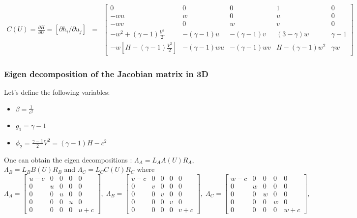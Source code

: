 \documentclass{article}
\begin{document}
\begin{eqnarray}
  C(U) = \frac{\partial H}{\partial U} = \left[ \partial h_i/\partial u_j \right] & = & \left[
    \begin{array}{ccccc}
      0 & 0 & 0 & 1 & 0\\
      -w u & w & 0 & u & 0\\
      -w v & 0 & w & v & 0\\
      -w^2+(\gamma-1)\frac{V^2}{2} & -(\gamma-1)u & -(\gamma-1)v & (3-\gamma) w &  \gamma-1\\
      -w [H - (\gamma-1)\frac{V^2}{2}] & -(\gamma-1)wu & -(\gamma-1)wv & H-(\gamma-1)w^2 & \gamma w
    \end{array}
  \right]
\end{eqnarray}

\subsubsection{Eigen decomposition of the Jacobian matrix in 3D}

Let's define the following variables:
\begin{itemize}
\item $\beta = \frac{1}{c^2}$
\item $g_1 = \gamma-1$
\item $\phi_2 = \frac{\gamma-1}{2}V^2 = (\gamma-1) H - c^2$
\end{itemize}

One can obtain the eigen decompositions : $\Lambda_A = L_A A(U) R_A$, $\Lambda_B = L_B B(U) R_B$ and $\Lambda_C = L_C C(U) R_C$ where
\begin{equation}
  \Lambda_A = \left[
    \begin{array}{ccccc}
      u-c& 0 & 0 & 0 & 0\\
      0  & u & 0 & 0 & 0\\
      0  & 0 & u & 0 & 0\\
      0  & 0 & 0 & u & 0\\
      0  & 0 & 0 & 0 & u+c
    \end{array}
  \right],\;
  \Lambda_B = \left[
    \begin{array}{ccccc}
      v-c& 0 & 0 & 0 & 0\\
      0  & v & 0 & 0 & 0\\
      0  & 0 & v & 0 & 0\\
      0  & 0 & 0 & v & 0\\
      0  & 0 & 0 & 0 & v+c
    \end{array}
  \right],\;
  \Lambda_C = \left[
    \begin{array}{ccccc}
      w-c& 0 & 0 & 0 & 0\\
      0  & w & 0 & 0 & 0\\
      0  & 0 & w & 0 & 0\\
      0  & 0 & 0 & w & 0\\
      0  & 0 & 0 & 0 & w+c
    \end{array}
  \right],\;
\end{equation}
\end{document}
